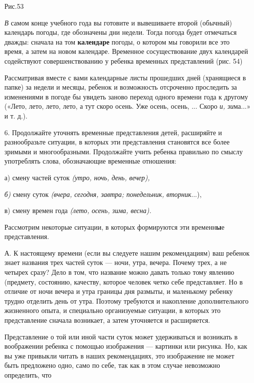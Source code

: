 \documentclass[a5paper]{book}
\renewcommand{\emph}[1]{\textit{#1}}
\begin{document}
Рис.53

\emph{В} самом конце учебного года вы готовите и вывешиваете второй
(обычный) календарь погоды, где обозначены дни недели. Тогда погода
будет отмечаться дважды: сначала на том \textbf{календаре} погоды, о
котором мы говорили все это время, а затем на новом календаре. Временное
сосуществование двух календарей содействуют совершенствованию у ребенка
временных представлений (рис. 54)

Рассматривая вместе с вами календарные листы прошедших дней (хранящиеся
в папке) за недели и месяцы, ребенок и возможность отсроченно проследить
за изменениями в погоде бы увидеть заново переход одного времени года к
другому («Лето, лето, лето, лето, а тут скоро осень. Уже осень, осень,
... Скоро \emph{и, зи}ма...» и т. д.).

6. Продолжайте уточнять временные представления детей, расширяйте и
разнообразьте ситуации, в которых эти представления становятся все более
зримыми и многообразными. Продолжайте учить ребенка правильно по смыслу
употреблять слова, обозначающие временные отношения:

а) смену частей суток \emph{(утро, ночь, день, вечер),}

\emph{б)} смену суток \emph{(вчера, сегодня, завтра; понедельник,
вторник}...),

в) смену времен года \emph{(лето, осень, зима, весна).}

Рассмотрим некоторые ситуации, в которых формируются эти
временн\textbf{ы}е представления.

А. К настоящему времени (если вы следуете нашим рекомендациям) ваш
ребенок знает названия трех частей суток --- ночи, утра, вечера. Почему
трех, а не четырех сразу? Дело в том, что название можно давать только
тому явлению (предмету, состоянию, качеству, которое человек четко себе
представляет. Но в отличие от ночи вечера и утра границы дня размыты, и
маленькому ребенку трудно отделить день от утра. Поэтому требуются и
накопление дополнительного жизненного опыта, и специально организуемые
ситуации, в которых это представление сначала возникает, а затем
уточняется и расширяется.

Представление о той или иной части суток может удерживаться и возникать
в воображении ребенка с помощью изображения --- картинки или рисунка.
Но, как вы уже привыкли читать в наших рекомендациях, это изображение не
может быть предложено одно, само по себе, так как в этом случае
невозможно определить, что
\end{document}
